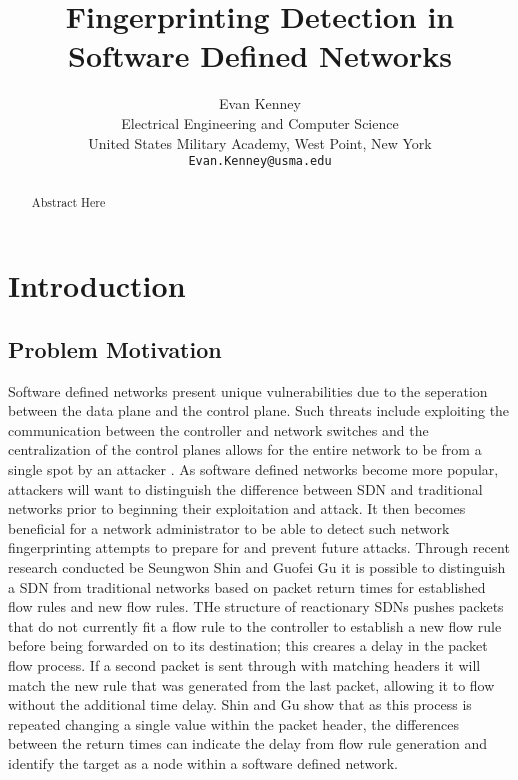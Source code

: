 \documentclass[twocolumn]{article}
\begin{document}
\title{Fingerprinting Detection in Software Defined Networks}
\author{Evan Kenney\\
	Electrical Engineering and Computer Science\\
	United States Military Academy, West Point, New York\\
	\texttt{Evan.Kenney@usma.edu}}
\maketitle

\begin{abstract}

Abstract Here

\end{abstract}

\section{Introduction}
\subsection{Problem Motivation}

Software defined networks present unique vulnerabilities due to the seperation between the data plane and the control plane. Such threats include exploiting the communication between the controller and network switches and the centralization of the control planes allows for the entire network to be from a single spot by an attacker \cite{kreutz}. As software defined networks become more popular, attackers will want to distinguish the difference between SDN and traditional networks prior to beginning their exploitation and attack. It then becomes beneficial for a network administrator to be able to detect such network fingerprinting attempts to prepare for and prevent future attacks. Through recent research conducted be Seungwon Shin and Guofei Gu \cite{Gu13} it is possible to distinguish a SDN from traditional networks based on packet return times for established flow rules and new flow rules. THe structure of reactionary SDNs pushes packets that do not currently fit a flow rule to the controller to establish a new flow rule before being forwarded on to its destination; this creares a delay in the packet flow process. If a second packet is sent through with matching headers it will match the new rule that was generated from the last packet, allowing it to flow without the additional time delay. Shin and Gu show that as this process is repeated changing a single value within the packet header, the differences between the return times can indicate the delay from flow rule generation and identify the target as a node within a software defined network.
\end{document}
